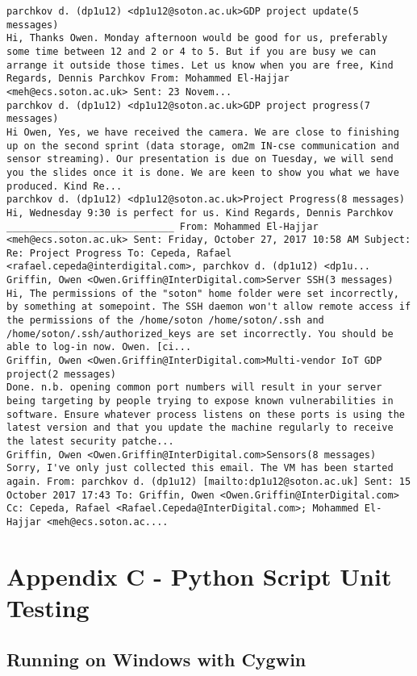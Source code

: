 \begin{lstlisting}
parchkov d. (dp1u12) <dp1u12@soton.ac.uk>GDP project update(5 messages)
Hi, Thanks Owen. Monday afternoon would be good for us, preferably some time between 12 and 2 or 4 to 5. But if you are busy we can arrange it outside those times. Let us know when you are free, Kind Regards, Dennis Parchkov From: Mohammed El-Hajjar <meh@ecs.soton.ac.uk> Sent: 23 Novem...
parchkov d. (dp1u12) <dp1u12@soton.ac.uk>GDP project progress(7 messages)
Hi Owen, Yes, we have received the camera. We are close to finishing up on the second sprint (data storage, om2m IN-cse communication and sensor streaming). Our presentation is due on Tuesday, we will send you the slides once it is done. We are keen to show you what we have produced. Kind Re...
parchkov d. (dp1u12) <dp1u12@soton.ac.uk>Project Progress(8 messages)
Hi, Wednesday 9:30 is perfect for us. Kind Regards, Dennis Parchkov _____________________________ From: Mohammed El-Hajjar <meh@ecs.soton.ac.uk> Sent: Friday, October 27, 2017 10:58 AM Subject: Re: Project Progress To: Cepeda, Rafael <rafael.cepeda@interdigital.com>, parchkov d. (dp1u12) <dp1u...
Griffin, Owen <Owen.Griffin@InterDigital.com>Server SSH(3 messages)
Hi, The permissions of the "soton" home folder were set incorrectly, by something at somepoint. The SSH daemon won't allow remote access if the permissions of the /home/soton /home/soton/.ssh and /home/soton/.ssh/authorized_keys are set incorrectly. You should be able to log-in now. Owen. [ci...
Griffin, Owen <Owen.Griffin@InterDigital.com>Multi-vendor IoT GDP project(2 messages)
Done. n.b. opening common port numbers will result in your server being targeting by people trying to expose known vulnerabilities in software. Ensure whatever process listens on these ports is using the latest version and that you update the machine regularly to receive the latest security patche...
Griffin, Owen <Owen.Griffin@InterDigital.com>Sensors(8 messages)
Sorry, I've only just collected this email. The VM has been started again. From: parchkov d. (dp1u12) [mailto:dp1u12@soton.ac.uk] Sent: 15 October 2017 17:43 To: Griffin, Owen <Owen.Griffin@InterDigital.com> Cc: Cepeda, Rafael <Rafael.Cepeda@InterDigital.com>; Mohammed El-Hajjar <meh@ecs.soton.ac....
\end{lstlisting}

\section{Appendix C - Python Script Unit Testing}

\subsection*{Running on Windows with Cygwin}


